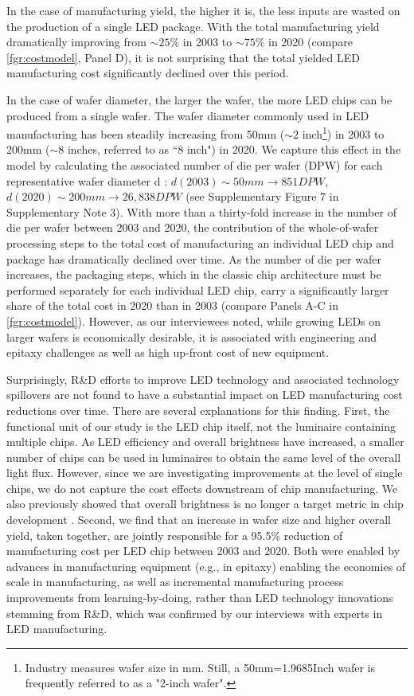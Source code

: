 \documentclass[parskip=full]{article}
\begin{document}
In the case of manufacturing yield, the higher it is, the less inputs are wasted on the production of a single LED package. With the total manufacturing yield dramatically improving from $\sim25\%$ in 2003 to $\sim75\%$ in 2020 (compare \cref{fgr:costmodel}, Panel D), it is not surprising that the total yielded LED manufacturing cost significantly declined over this period.

In the case of wafer diameter, the larger the wafer, the more LED chips can be produced from a single wafer. The wafer diameter commonly used in LED manufacturing has been steadily increasing from 50mm ($\sim2$ inch\footnote{Industry measures wafer size in mm. Still, a 50mm=1.9685Inch wafer is frequently referred to as a "2-inch wafer".}) in 2003 to 200mm ($\sim$8 inches, referred to as “8 inch") in 2020. We capture this effect in the model by calculating the associated number of die per wafer (DPW) for each representative wafer diameter d \cite{de2005investigation}: $d(2003)\sim 50 mm \rightarrow851 DPW$, $d(2020)\sim200 mm \rightarrow 26,838 DPW$ (see Supplementary Figure 7 in Supplementary Note 3). With more than a thirty-fold increase in the number of die per wafer between 2003 and 2020, the contribution of the whole-of-wafer processing steps to the total cost of manufacturing an individual LED chip and package has dramatically declined over time. As the number of die per wafer increases, the packaging steps, which in the classic chip architecture must be performed separately for each individual LED chip, carry a significantly larger share of the total cost in 2020 than in 2003 (compare Panels A-C in \cref{fgr:costmodel}). However, as our interviewees noted, while growing LEDs on larger wafers is economically desirable, it is associated with engineering and epitaxy challenges as well as high up-front cost of new equipment.

Surprisingly, R\&D efforts to improve LED technology and associated technology spillovers are not found to have a substantial impact on LED manufacturing cost reductions over time. There are several explanations for this finding. First, the functional unit of our study is the LED chip itself, not the luminaire containing multiple chips. As LED efficiency and overall brightness have increased, a smaller number of chips can be used in luminaires to obtain the same level of the overall light flux. However, since we are investigating improvements at the level of single chips, we do not capture the cost effects downstream of chip manufacturing. We also previously showed that overall brightness is no longer a target metric in chip development \cite{weinold2021compound}. Second, we find that an increase in wafer size and higher overall yield, taken together, are jointly responsible for a 95.5\% reduction of manufacturing cost per LED chip between 2003 and 2020. Both were enabled by advances in manufacturing equipment (e.g., in epitaxy) enabling the economies of scale in manufacturing, as well as incremental manufacturing process improvements from learning-by-doing, rather than LED technology innovations stemming from R\&D, which was confirmed by our interviews with experts in LED manufacturing.
\end{document}
